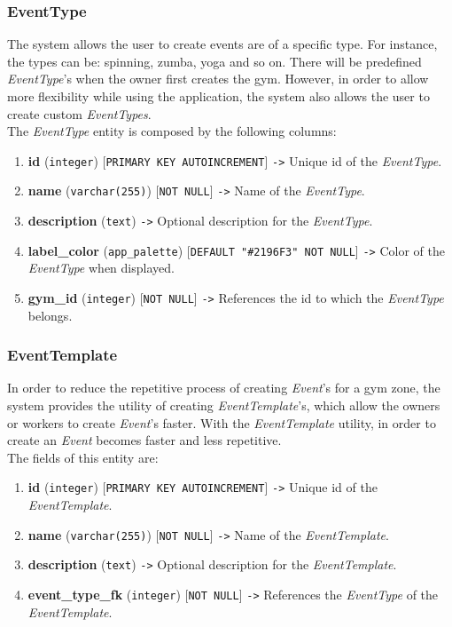 \documentclass[a4paper, 12pt, oneside]{book}
\begin{document}
\subsubsection{EventType}
The system allows the user to create events are of a specific type. For instance, the types can be: spinning, zumba, yoga and so on. There will be predefined \emph{EventType}'s when the owner first creates the gym. However, in order to allow more flexibility while using the application, the system also allows the user to create custom \emph{EventTypes}.
\\[8pt]
The \emph{EventType} entity is composed by the following columns:
\begin{enumerate}[label = -]
	\item \textbf{id} (\texttt{integer}) [\texttt{PRIMARY KEY AUTOINCREMENT}] \texttt{->} Unique id of the \emph{EventType}.
	\item \textbf{name} (\texttt{varchar(255)}) [\texttt{NOT NULL}] \texttt{->} Name of the \emph{EventType}.
	\item \textbf{description} (\texttt{text}) \texttt{->} Optional description for the \emph{EventType}.
	\item \textbf{label\_color} (\texttt{app\_palette}) [\texttt{DEFAULT "\#2196F3" NOT NULL}] \texttt{->} Color of the \emph{EventType} when displayed.
	\item \textbf{gym\_id} (\texttt{integer}) [\texttt{NOT NULL}] \texttt{->} References the id to which the \emph{EventType} belongs.
\end{enumerate}
\subsubsection{EventTemplate}
In order to reduce the repetitive process of creating \emph{Event}'s for a gym zone, the system provides the utility of creating \emph{EventTemplate}'s, which allow the owners or workers to create \emph{Event}'s faster. With the \emph{EventTemplate} utility, in order to create an \emph{Event} becomes faster and less repetitive.
\\[8pt]
The fields of this entity are:
\begin{enumerate}[label = -]
	\item \textbf{id} (\texttt{integer}) [\texttt{PRIMARY KEY AUTOINCREMENT}] \texttt{->} Unique id of the \emph{EventTemplate}.
	\item \textbf{name} (\texttt{varchar(255)}) [\texttt{NOT NULL}] \texttt{->} Name of the \emph{EventTemplate}.
	\item \textbf{description} (\texttt{text}) \texttt{->} Optional description for the \emph{EventTemplate}.
	\item \textbf{event\_type\_fk} (\texttt{integer}) [\texttt{NOT NULL}] \texttt{->} References the \emph{EventType} of the \emph{EventTemplate}.
\end{enumerate}
\end{document}
